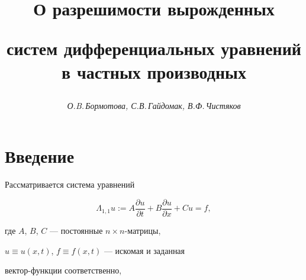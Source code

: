








\author{\it О.B.\,Бормотова, С.В.\,Гайдомак, В.Ф.\,Чистяков}




\title{О разрешимости вырожденных


систем дифференциальных уравнений в частных производных}





\date{}




\pagestyle{plain} %







\maketitle


\label{begin}











\section{Введение}





Рассматривается система уравнений


\begin{equation}


\Lambda _{1,1}u:=


A\frac{\partial u}{\partial t}+B\frac{\partial u}{\partial x}+Cu=f,


\end{equation}


где $A$, $B$, $C$ --- постоянные $n\times n$-матрицы,


$u\equiv u(x,t)$, $f\equiv f(x,t)$ --- искомая и заданная


век\-тор-функции соответственно,


